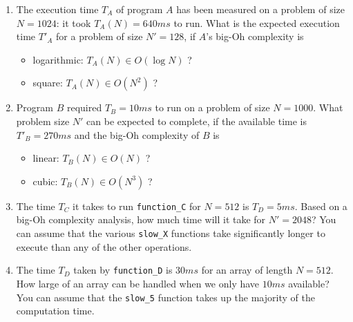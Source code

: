 \documentclass[a4paper]{article}
\begin{document}
\begin{enumerate}

\item
  The execution time $T_A$ of program $A$ has been measured on a problem of size $N=1024$:
  it took $T_A(N) = 640ms$ to run.
  What is the expected execution time $T'_A$ for a problem of size $N'=128$, if $A$'s big-Oh complexity is
  \begin{itemize}
  \item
    logarithmic: $T_A(N) \in O(\log N)$ ?
  \item
    square: $T_A(N) \in O(N^2)$ ?
  \end{itemize}
  
\item
  Program $B$ required $T_B=10ms$ to run on a problem of size $N=1000$.
  What problem size $N'$ can be expected to complete, if the available time is $T'_B=270ms$ and the big-Oh complexity of $B$ is
  \begin{itemize}
  \item
    linear: $T_B(N) \in O(N)$ ?
  \item
    cubic: $T_B(N) \in O(N^3)$ ?
  \end{itemize}
  
\item
  The time $T_C$ it takes to run \texttt{function\_C} for $N=512$ is $T_D=5ms$.
  Based on a big-Oh complexity analysis, how much time will it take for $N'=2048$?
  You can assume that the various \texttt{slow\_X} functions take significantly longer to execute than any of the other operations.
  
  \begin{center}
  \end{center}
  
\item
  The time $T_D$ taken by \texttt{function\_D} is $30ms$ for an array of length $N=512$.
  How large of an array can be handled when we only have $10ms$ available?
  You can assume that the \texttt{slow\_5} function takes up the majority of the computation time.
  
  \begin{center}
  \end{center}
  
\end{enumerate}
\end{document}
